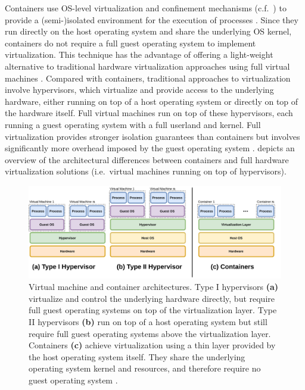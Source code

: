 Containers use OS-level virtualization and confinement mechanisms (c.f.~) to provide a (semi-)isolated environment for the execution of processes \cite{sultan2019_container_security}. Since they run directly on the host operating system and share the underlying OS kernel, containers do not require a full guest operating system to implement virtualization. This technique has the advantage of offering a light-weight alternative to traditional hardware virtualization approaches using full virtual machines \cite{sultan2019_container_security}. Compared with containers, traditional approaches to virtualization involve hypervisors, which virtualize and provide access to the underlying hardware, either running on top of a host operating system or directly on top of the hardware itself. Full virtual machines run on top of these hypervisors, each running a guest operating system with a full userland and kernel. Full virtualization provides stronger isolation guarantees than containers but involves significantly more overhead imposed by the guest operating system \cite{sultan2019_container_security}.  depicts an overview of the architectural differences between containers and full hardware virtualization solutions (i.e.~virtual machines running on top of hypervisors).

\begin{figure}[htpb]
  \centering
  \includegraphics[width=0.8\linewidth]{figs/virtualization.pdf}
  \caption{
    Virtual machine and container architectures. Type I hypervisors \textbf{(a)} virtualize and control the underlying hardware directly, but require full guest operating systems on top of the virtualization layer. Type II hypervisors \textbf{(b)} run on top of a host operating system but still require full guest operating systems above the virtualization layer. Containers \textbf{(c)} achieve virtualization using a thin layer provided by the host operating system itself. They share the underlying operating system kernel and resources, and therefore require no guest operating system \cite{sultan2019_container_security}.
  }%
  \label{fig:virt}
\end{figure}

